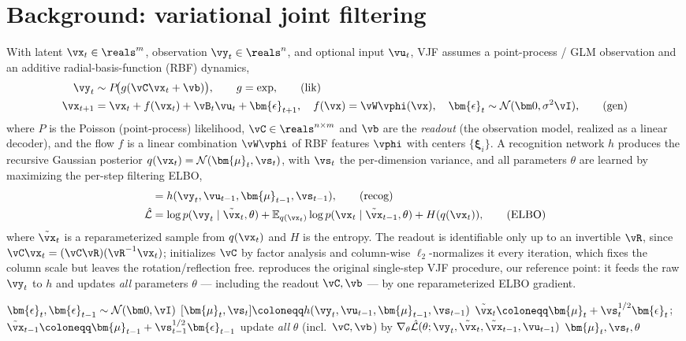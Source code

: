 \documentclass[11pt]{article}
\newcommand{\E}{\mathbb{E}}
\newcommand{\vmu}{\bm{\mu}}
\newcommand{\veps}{\bm{\epsilon}}
\newcommand{\vxi}{\bm{\xi}}
\begin{document}
\section{Background: variational joint filtering}\label{sec:bg}
With latent $\vx_t\in\reals^m$, observation $\vy_t\in\reals^n$, and optional input $\vu_t$, VJF
assumes a point-process / GLM observation and an additive radial-basis-function (RBF) dynamics,
\begin{align}
  \vy_t &\sim P\!\big(g(\vC\vx_t+\vb)\big), \qquad g=\exp, \tag{lik}\label{eq:lik}\\
  \vx_{t+1} &= \vx_t + f(\vx_t) + \vB_t\vu_t + \veps_{t+1},\quad
  f(\vx)=\vW\vphi(\vx),\quad \veps_t\sim\mathcal N(\bm0,\sigma^2\vI), \tag{gen}\label{eq:gen}
\end{align}
where $P$ is the Poisson (point-process) likelihood, $\vC\in\reals^{n\times m}$ and $\vb$ are the
\emph{readout} (the observation model, realized as a linear decoder), and the flow $f$ is a linear
combination $\vW\vphi$ of RBF features $\vphi$ with centers $\{\vxi_i\}$. A recognition network
$h$ produces the recursive Gaussian posterior $q(\vx_t)=\mathcal N(\vmu_t,\vs_t)$, with $\vs_t$
the per-dimension variance, and all parameters $\theta$ are learned by maximizing the per-step
filtering ELBO,
\begin{align}
  [\vmu_t,\vs_t] &= h(\vy_t,\vu_{t-1},\vmu_{t-1},\vs_{t-1}), \tag{recog}\label{eq:recog}\\
  \hat{\mathcal L} &= \log p(\vy_t\mid\tilde\vx_t,\theta)
     + \E_{q(\vx_t)}\log p(\vx_t\mid\tilde\vx_{t-1},\theta) + H(q(\vx_t)), \tag{ELBO}\label{eq:elbo}
\end{align}
where $\tilde\vx_t$ is a reparameterized sample from $q(\vx_t)$ and $H$ is the entropy. The readout
is identifiable only up to an invertible $\vR$, since $\vC\vx_t=(\vC\vR)(\vR^{-1}\vx_t)$;
\autocite{zhao2020variational} initializes $\vC$ by factor analysis and column-wise
$\ell_2$-normalizes it every iteration, which fixes the column scale but leaves the
rotation/reflection free.  reproduces the original single-step VJF procedure,
our reference point: it feeds the raw $\vy_t$ to $h$ and updates \emph{all} parameters $\theta$
--- including the readout $\vC,\vb$ --- by one reparameterized ELBO gradient.

\begin{algorithm}[!ht]
\caption{Vanilla VJF, single step (reproduced from \autocite{zhao2020variational}).}
\label{alg:vjf}
\begin{algorithmic}[1]
\Procedure{Vjf}{$\vy_t,\vu_{t-1},\vmu_{t-1},\vs_{t-1},\theta$}
  \State $\veps_t,\veps_{t-1}\sim\mathcal N(\bm0,\vI)$ 
  \State $[\vmu_t,\vs_t]\coloneqq h(\vy_t,\vu_{t-1},\vmu_{t-1},\vs_{t-1})$ 
  \State $\tilde\vx_t\coloneqq\vmu_t+\vs_t^{1/2}\veps_t$;\quad $\tilde\vx_{t-1}\coloneqq\vmu_{t-1}+\vs_{t-1}^{1/2}\veps_{t-1}$
  \State update \emph{all} $\theta$ (incl.\ $\vC,\vb$) by $\nabla_{\theta}\hat{\mathcal L}(\theta;\vy_t,\tilde\vx_t,\tilde\vx_{t-1},\vu_{t-1})$ 
  \State \Return $\vmu_t,\vs_t,\theta$
\EndProcedure
\end{algorithmic}
\end{algorithm}
\end{document}
